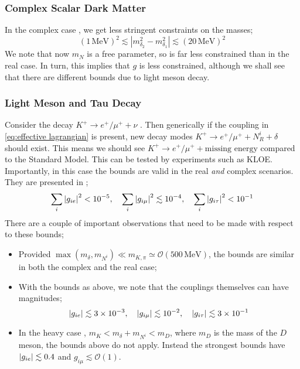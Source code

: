 \vspace{-0.3cm}

\subsubsection*{Complex Scalar Dark Matter}
In the complex case \cite{Boehm2006}, we get less stringent constraints on the masses;
  \begin{equation}
    (1\, \text{MeV})^2 \lesssim \left|m_{\delta_2}^2 - m_{\delta_1}^2\right| \lesssim (20 \, \text{MeV})^2
  \end{equation}
\noindent We note that now $m_N$ is a free parameter, so is far less constrained than in the real case. In turn, this implies that $g$ is less constrained, although we shall see that there are different bounds due to light meson decay.

\vspace{-0.3cm}

\subsubsection{Light Meson and Tau Decay}


Consider the decay $K^+ \rightarrow e^+/\mu^+ + \nu$ \cite{Farzan2011, Farzan2014, Farzan2010}. Then generically if the coupling in \eqref{eq:effective lagrangian} is present, new decay modes $K^+ \rightarrow e^+/\mu^+ + N^i_R + \delta$ should exist. This means we should see $K^+ \rightarrow e^+/\mu^+ + \text{missing energy}$ compared to the Standard Model. This can be tested by experiments such as KLOE. Importantly, in this case the bounds are valid in the real \emph{and} complex scenarios. They are presented in \cite{Farzan2011, Farzan2014, Farzan2010, Artamonov2016};
  \begin{equation}
    \sum_{i}{\left|g_{ie}\right|^2} < 10^{-5}, \quad \sum_{i}{\left|g_{i\mu}\right|^2} \lesssim 10^{-4}, \quad \sum_{i}{\left|g_{i\tau}\right|^2} < 10^{-1}
  \end{equation}
\noindent There are a couple of important observations that need to be made with respect to these bounds;
\begin{itemize}
  \item Provided $\max(m_\delta, m_{N^i}) \ll m_{K, \pi} \simeq \mathcal{O}(500\,\text{MeV})$, the bounds are similar in both the complex and the real case;
  \item With the bounds as above, we note that the couplings themselves can have magnitudes;
  \begin{equation}
    \label{eq:constraints}
    \left|g_{ie}\right| \lesssim 3 \times 10^{-3}, \quad \left|g_{i\mu}\right| \lesssim 10^{-2}, \quad \left|g_{i\tau}\right| \lesssim 3 \times 10^{-1}
  \end{equation}
  \item In the heavy case \cite{Farzan2014}, $m_K < m_\delta + m_{N^i} < m_D$, where $m_D$ is the mass of the $D$ meson, the bounds above do not apply. Instead the strongest bounds have $\left|g_{ie}\right| \lesssim 0.4$ and $g_{i\mu} \lesssim \mathcal{O}(1)$.
\end{itemize}

